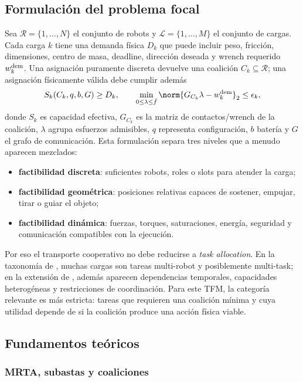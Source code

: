 \subsection{Formulación del problema focal}

Sea $\mathcal R=\{1,\dots,N\}$ el conjunto de robots y
$\mathcal L=\{1,\dots,M\}$ el conjunto de cargas. Cada carga $k$ tiene una demanda
física $D_k$ que puede incluir peso, fricción, dimensiones, centro de masa, deadline,
dirección deseada y wrench requerido $w_k^{\rm dem}$. Una asignación puramente discreta
devuelve una coalición $C_k\subseteq\mathcal R$; una asignación físicamente válida debe
cumplir además
\[
  S_k(C_k,q,b,G) \ge D_k,
  \qquad
  \min_{0\leq\lambda\leq\bar f}
  \norm{G_{C_k}\lambda-w_k^{\rm dem}}_2 \leq \epsilon_k,
\]
donde $S_k$ es capacidad efectiva, $G_{C_k}$ es la matriz de contactos/wrench de la
coalición, $\lambda$ agrupa esfuerzos admisibles, $q$ representa configuración, $b$
batería y $G$ el grafo de comunicación. Esta formulación separa tres niveles que a menudo
aparecen mezclados:
\begin{itemize}[leftmargin=2em]
  \item \textbf{factibilidad discreta}: suficientes robots, roles o slots para atender la
  carga;
  \item \textbf{factibilidad geométrica}: posiciones relativas capaces de sostener,
  empujar, tirar o guiar el objeto;
  \item \textbf{factibilidad dinámica}: fuerzas, torques, saturaciones, energía, seguridad
  y comunicación compatibles con la ejecución.
\end{itemize}

Por eso el transporte cooperativo no debe reducirse a \emph{task allocation}. En la
taxonomía de \citet{gerkey2004formal}, muchas cargas son tareas multi-robot y
posiblemente multi-task; en la extensión de \citet{korsah2013taxonomy}, además aparecen
dependencias temporales, capacidades heterogéneas y restricciones de coordinación. Para
este TFM, la categoría relevante es más estricta: tareas que requieren una coalición
mínima y cuya utilidad depende de si la coalición produce una acción física viable.



\subsection{Fundamentos teóricos}

\subsubsection{MRTA, subastas y coaliciones}

